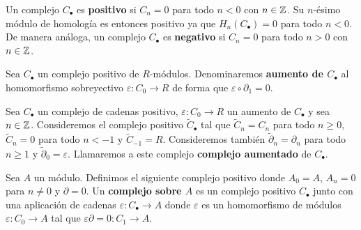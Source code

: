 \begin{definicion}
	Un complejo \(C_{\bullet}\) es \textbf{positivo} si \(C_{n}= 0\) para todo \(n < 0\)
	con \(n \in \mathbb{Z}\). Su \(n\)-ésimo módulo de homología es entonces positivo ya que \(H
	_{n}(C_{\bullet}) = 0\) para todo \(n < 0\). De manera análoga, un complejo \(C_{\bullet}\)
	es \textbf{negativo} si \(C_{n}= 0\) para todo \(n > 0\) con \(n \in \mathbb{Z}\).
\end{definicion}
%

\begin{definicion}
	Sea \(C_{\bullet}\) un complejo positivo de \(R\)-módulos. Denominaremos \textbf{aumento
		de \(C_{\bullet}\)} al homomorfismo sobreyectivo \(\varepsilon : C_{0}\to R\) de forma
	que \(\varepsilon \circ \partial_{1}= 0\).
\end{definicion}

\begin{definicion}
	Sea \(C_{\bullet}\) un complejo de cadenas positivo, \(\varepsilon : C_{0}\to R\)
	un aumento de \(C_{\bullet}\) y sea \(n \in \mathbb{Z}\). Consideremos el complejo positivo
	\(\widetilde{C}_{\bullet}\) tal que \(\widetilde{C}_{n}= C_{n}\) para todo \(n \geq
	0\), \(\widetilde{C}_{n}= 0\) para todo \(n < -1\) y \(\widetilde{C}_{-1}=R\). Consideremos
	también \(\widetilde{\partial}_{n}= \partial_{n}\) para todo \(n \geq 1\) y \(\widetilde
	{\partial}_{0}= \varepsilon\). Llamaremos a este complejo \textbf{complejo
		aumentado} de \(C_{\bullet}\).
\end{definicion}
%

\begin{definicion}
	Sea \(A\) un módulo. Definimos el siguiente complejo positivo donde \(A_{0}= A\), \(A
	_{n}= 0\) para \(n \neq 0\) y \(\partial = 0\). Un \textbf{complejo sobre \(A\)} es un
	complejo positivo \(C_{\bullet}\) junto con una aplicación de cadenas \(\varepsilon
	: C_{\bullet}\to A\) donde \(\varepsilon\) es un homomorfismo de módulos \(\varepsilon
	: C_{0}\to A\) tal que \(\varepsilon \partial = 0: C_{1}\to A\).
\end{definicion}

